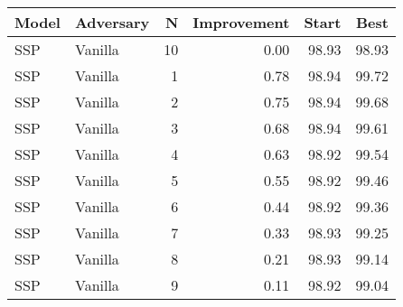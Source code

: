 \begin{tabular}{llrrrr}
\toprule
Model & Adversary &   N &  Improvement &  Start &   Best \\
\midrule
  SSP &   Vanilla &  10 &         0.00 &  98.93 &  98.93 \\
  SSP &   Vanilla &   1 &         0.78 &  98.94 &  99.72 \\
  SSP &   Vanilla &   2 &         0.75 &  98.94 &  99.68 \\
  SSP &   Vanilla &   3 &         0.68 &  98.94 &  99.61 \\
  SSP &   Vanilla &   4 &         0.63 &  98.92 &  99.54 \\
  SSP &   Vanilla &   5 &         0.55 &  98.92 &  99.46 \\
  SSP &   Vanilla &   6 &         0.44 &  98.92 &  99.36 \\
  SSP &   Vanilla &   7 &         0.33 &  98.93 &  99.25 \\
  SSP &   Vanilla &   8 &         0.21 &  98.93 &  99.14 \\
  SSP &   Vanilla &   9 &         0.11 &  98.92 &  99.04 \\
\bottomrule
\end{tabular}
